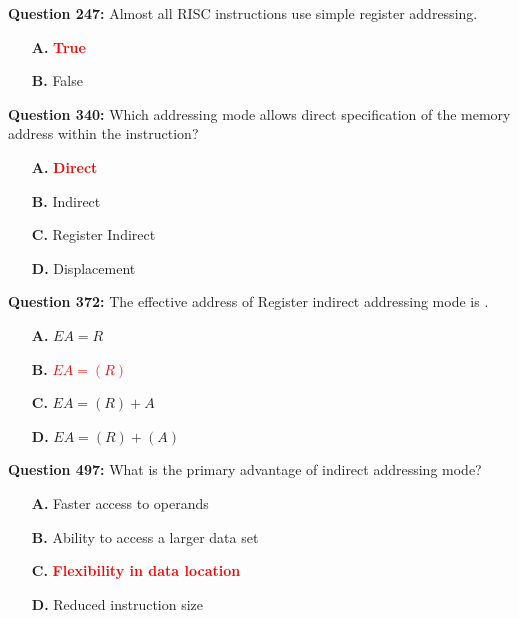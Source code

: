 \documentclass[12pt,a4paper]{article}
\begin{document}
\vspace{0.5cm}

\textbf{Question 247:} Almost all RISC instructions use simple register addressing.

\begin{itemize}
    \item[\textbf{A.}] \textcolor{red}{\textbf{True}}
    \item[\textbf{B.}] False
\end{itemize}

\vspace{0.5cm}

\vspace{0.5cm}

\textbf{Question 340:} Which addressing mode allows direct specification of the memory address within the instruction?

\begin{itemize}
    \item[\textbf{A.}] \textcolor{red}{\textbf{Direct}}
    \item[\textbf{B.}] Indirect
    \item[\textbf{C.}] Register Indirect
    \item[\textbf{D.}] Displacement
\end{itemize}

\vspace{0.5cm}

\vspace{0.5cm}

\textbf{Question 372:} The effective address of Register indirect addressing mode is \underline{\hspace{1.5cm}}.

\begin{itemize}
    \item[\textbf{A.}] $EA = R$
    \item[\textbf{B.}] \textcolor{red}{\textbf{$EA = (R)$}}
    \item[\textbf{C.}] $EA = (R) + A$
    \item[\textbf{D.}] $EA = (R) + (A)$
\end{itemize}

\vspace{0.5cm}

\vspace{0.5cm}

\textbf{Question 497:} What is the primary advantage of indirect addressing mode?

\begin{itemize}
    \item[\textbf{A.}] Faster access to operands
    \item[\textbf{B.}] Ability to access a larger data set
    \item[\textbf{C.}] \textcolor{red}{\textbf{Flexibility in data location}}
    \item[\textbf{D.}] Reduced instruction size
\end{itemize}
\end{document}
